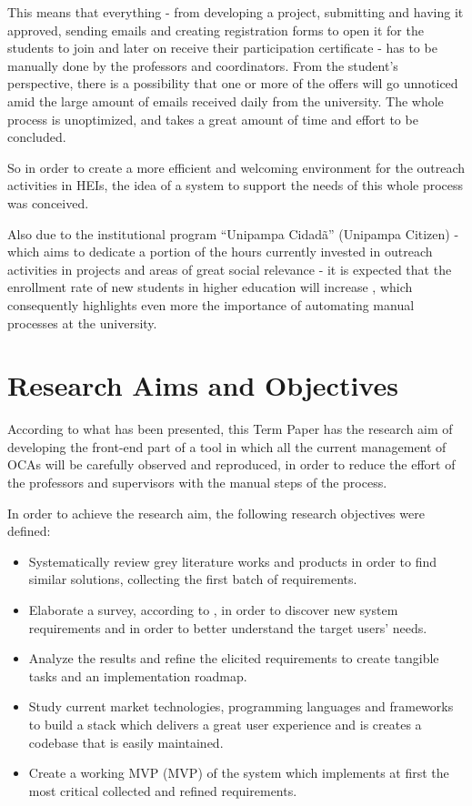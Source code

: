 This means that everything - from developing a project, submitting and having it approved, sending emails and creating registration forms to open it for the students to join and later on receive their participation certificate - has to be manually done by the professors and coordinators. From the student's perspective, there is a possibility that one or more of the offers will go unnoticed amid the large amount of emails received daily from the university. The whole process is unoptimized, and takes a great amount of time and effort to be concluded.

So in order to create a more efficient and welcoming environment for the outreach activities in \acp{HEI}, the idea of a system to support the needs of this whole process was conceived.

Also due to the institutional program ``Unipampa Cidadã'' (Unipampa Citizen) - which aims to dedicate a portion of the hours currently invested in outreach activities in projects and areas of great social relevance - it is expected that the enrollment rate of new students in higher education will increase \cite{unipampacidada}, which consequently highlights even more the importance of automating manual processes at the university.

\section{Research Aims and Objectives}\label{sec:objectives}

According to what has been presented, this Term Paper has the research aim of developing the front-end part of a tool in which all the current management of \acp{OCA} will be carefully observed and reproduced, in order to reduce the effort of the professors and supervisors with the manual steps of the process.

In order to achieve the research aim, the following research objectives were defined:

\begin{itemize}
  \item Systematically review grey literature works and products in order to find similar solutions, collecting the first batch of requirements.
  \item Elaborate a survey, according to , in order to discover new system requirements and in order to better understand the target users' needs.
  \item Analyze the results and refine the elicited requirements to create tangible tasks and an implementation roadmap.
  \item Study current market technologies, programming languages and frameworks to build a stack which delivers a great user experience and is creates a codebase that is easily maintained.
  \item Create a working \acl{MVP} (\ac{MVP}) of the system which implements at first the most critical collected and refined requirements.
\end{itemize}

